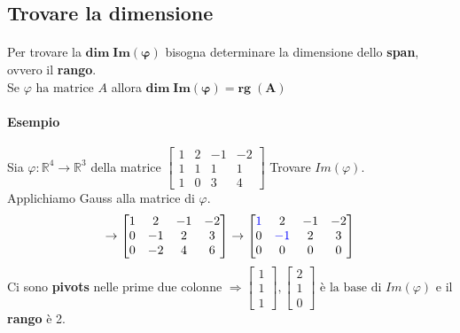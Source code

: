 \documentclass[a4paper, 12pt]{report}
\begin{document}
            \subsection{Trovare la dimensione}
            \paragraph{}Per trovare la $\boldsymbol{dim \; Im(\varphi)}$ bisogna determinare la dimensione dello \textbf{span}, ovvero il \textbf{rango}.\\
            Se $\varphi \text{ ha matrice } A$ allora $\boldsymbol{dim \; Im(\varphi)=rg \; (A)}$
            \paragraph{Esempio} Sia $\varphi: \mathbb{R}^4\rightarrow \mathbb{R}^3$ della matrice
            $
            \begin{bmatrix}
                1 & 2 & -1 & -2\\
                1 & 1 & 1 & 1\\
                1 & 0 & 3 & 4
            \end{bmatrix}
            $
            Trovare $Im(\varphi)$.\\
            Applichiamo Gauss alla matrice di $\varphi$.
            $$
            \rightarrow
            \begin{bmatrix}
                1 & 2 & -1 & -2\\
                0 & -1 & 2 & 3\\
                0 & -2 & 4 & 6
            \end{bmatrix}
            \rightarrow
            \begin{bmatrix}
                \textcolor{blue}{1} & 2 & -1 & -2\\
                0 & \textcolor{blue}{-1} & 2 & 3\\
                0 & 0 & 0 & 0
            \end{bmatrix}
            $$
            Ci sono \textbf{pivots} nelle prime due colonne $\Rightarrow
            \begin{bmatrix}
                1\\
                1\\
                1
            \end{bmatrix}
            ,
            \begin{bmatrix}
                2\\
                1\\
                0
            \end{bmatrix}
            \text{ è la base di }Im(\varphi)$ e il \textbf{rango} è 2.
\end{document}
